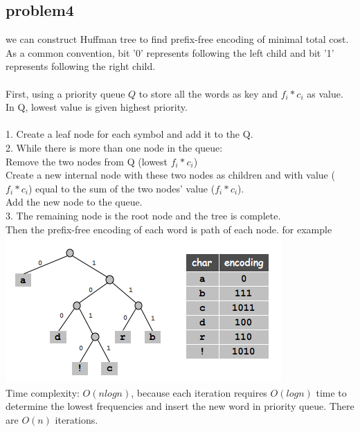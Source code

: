 \documentclass[11pt]{article}
\newcommand\tab[1][1cm]{\hspace*{#1}}
\begin{document}
\subsection{problem4}
we can construct Huffman tree to find prefix-free encoding of minimal total cost.
As a common convention, bit '0' represents following the left child and bit '1' represents following the right child.\\
\\
First, using a priority queue $Q$ to store all the words as key and $f_i*c_i$ as value. In Q, lowest value is given highest priority. \\
\\
1. Create a leaf node for each symbol and add it to the	Q.\\
2. While there is more than one node in the queue:\\
\tab Remove the two nodes from Q (lowest $f_i*c_i$)\\
\tab Create a new internal node with these two nodes as children and with value ($f_i*c_i$) equal to the sum of the two nodes' value ($f_i*c_i$).\\
\tab Add the new node to the queue.\\
3. The remaining node is the root node and the tree is complete.\\

Then the prefix-free encoding of each word is path of each node. for example\\
\includegraphics[scale=0.7]{huff}\\
Time complexity: $O(nlogn)$, because each iteration requires $O(logn)$ time to determine the lowest frequencies and insert the new word in priority queue. There are $O(n)$ iterations.
\end{document}

